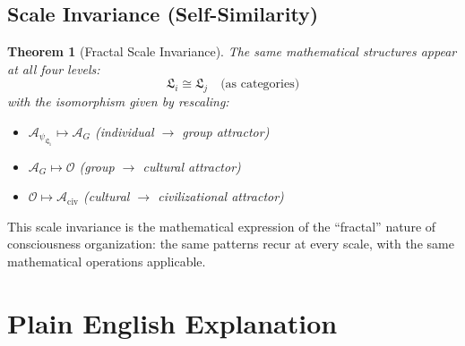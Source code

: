 \documentclass[11pt,twoside]{book}
\newcommand{\Level}[1]{\mathfrak{L}_{#1}}
\newcommand{\PsychAttractor}{\mathcal{A}_\psi}
\newcommand{\Overton}{\mathcal{O}}
\newtheorem{theorem}{Theorem}[chapter]
\begin{document}
\section{Scale Invariance (Self-Similarity)}

\begin{theorem}[Fractal Scale Invariance]
\label{thm:scale-invariance}
The same mathematical structures appear at all four levels:
\begin{equation}
    \Level{i} \cong \Level{j} \quad \text{(as categories)}
\end{equation}
with the isomorphism given by rescaling:
\begin{itemize}
    \item $\PsychAttractor_{\Level{1}} \mapsto \mathcal{A}_G$ (individual $\to$ group attractor)
    \item $\mathcal{A}_G \mapsto \Overton$ (group $\to$ cultural attractor)
    \item $\Overton \mapsto \mathcal{A}_{\mathrm{civ}}$ (cultural $\to$ civilizational attractor)
\end{itemize}
\end{theorem}

This scale invariance is the mathematical expression of the ``fractal'' nature of
consciousness organization: the same patterns recur at every scale, with the same
mathematical operations applicable.

\chapter{Plain English Explanation}
\label{ch:plain-english}
\end{document}
